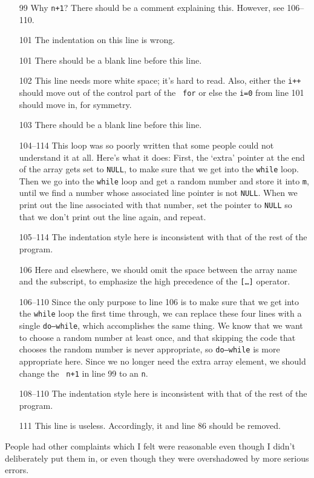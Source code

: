 \begin{itemize}
\item[99] Why {\tt n+1}?  There should be a comment explaining this.
However, see 106--110.
\item[101] The indentation on this line is wrong.
\item[101] There should be a blank line before this line.
\item[102] This line needs more white space; it's hard to read.  Also,
either the {\tt i++} should move out of the control part of the {\tt
for} or else the {\tt i=0} from line 101 should move in, for symmetry.
\item[103] There should be a blank line before this line.
\item[104--114] This loop was so poorly written that some people could
not understand it at all.  Here's what it does: First, the `extra'
pointer at the end of the array gets set to {\tt NULL}, to make sure
that we get into the {\tt while} loop.  Then we go into the {\tt while}
loop and get a random number and store it into {\tt m}, until we find a
number whose associated line pointer is not {\tt NULL}.  When we print
out the line associated with that number, set the pointer to {\tt NULL}
so that we don't print out the line again, and repeat.  
\item[105--114] The indentation style here is inconsistent with that of
the rest of the program.
\item[106] Here and elsewhere, we should omit the space between the
array name and the subscript, to emphasize the high precedence of the
{\tt [{\rm\ldots}]} operator.
\item[106--110] Since the only purpose to line 106 is to make sure that
we get into the {\tt while} loop the first time through, we can replace
these four lines with a single {\tt do{\rm--}while}, which accomplishes
the same thing.  We know that we want to choose a random number at least
once, and that skipping the code that chooses the random number is never
appropriate, so {\tt do{\rm--}while} is more appropriate here.   Since
we no longer need the extra array element, we should change the {\tt
n+1} in line 99 to an {\tt n}. 
\item[108--110] The indentation style here is inconsistent with that of
the rest of the program.
\item[111] This line is useless.   Accordingly, it and line 86 should be
removed.
\end{itemize}

People had other complaints which I felt were reasonable even though I
didn't deliberately put them in, or even though they were overshadowed
by more serious errors.  


